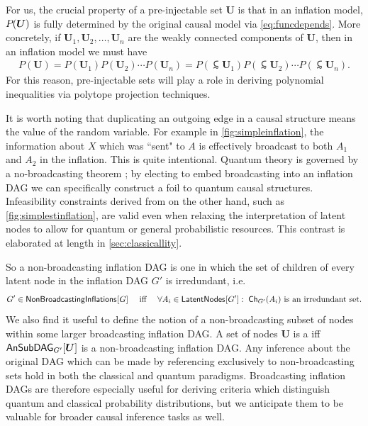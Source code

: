 {For us, the crucial property of a pre-injectable set $\bm{U}$ is that in an inflation model, $\pdf{\bm{U}}$ is fully determined by the original causal model via \cref{eq:funcdepends}. More concretely, if $\bm{U}_1,\bm{U}_2,\ldots,\bm{U}_n$ are the weakly connected components of $\bm{U}$, then in an inflation model we must have
\begin{align}\label{eq:preinjfactor}
	P(\bm{U}) = P(\bm{U}_1) P(\bm{U}_2)  \cdots P(\bm{U}_n) = P(\subsim{\bm{U}}_1) P(\subsim{\bm{U}}_2) \cdots P(\subsim{\bm{U}}_n).
\end{align}
For this reason, pre-injectable sets will play a role in deriving polynomial inequalities via polytope projection techniques.

It is worth noting that duplicating an outgoing edge in a causal structure means  the value of the random variable. For example in \cref{fig:simpleinflation}, the information about $X$ which was ``sent" to $A$ is effectively broadcast to both $A_1$ and $A_2$ in the inflation. This is quite intentional. Quantum theory is governed by a no-broadcasting theorem \cite{NoCloningQuantum1996,NoCloningGeneral2006}; by electing to embed broadcasting into an inflation DAG we can specifically construct a foil to quantum causal structures. Infeasibility constraints derived from  on the other hand, such as \cref{fig:simplestinflation}, are valid even when relaxing the interpretation of latent nodes to allow for quantum or general probabilistic resources. This contrast is elaborated at length in \cref{sec:classicallity}.  

So a non-broadcasting inflation DAG is one in which the set of children of every latent node in the inflation DAG $G'$ is irredundant, i.e.  
\begin{align}\label{eq:nonbroadcastinginflationDAG}
G'\in\SmallNamedFunction{NonBroadcastingInflations}{G} \quad\text{ iff }\quad \forall A_i\in \SmallNamedFunction{LatentNodes}{G'} :\; \Ch[G']{A_i} \text{ is an irredundant set.}
\end{align}
We also find it useful to define the notion of a non-broadcasting subset of nodes within some larger broadcasting inflation DAG. A set of nodes $\bm{U}$ is a  iff $\ansubgraph[G']{\bm{U}}$ is a non-broadcasting inflation DAG. Any inference about the original DAG which can be made by referencing exclusively to non-broadcasting sets hold in both the classical and quantum paradigms. Broadcasting inflation DAGs are therefore especially useful for deriving criteria which distinguish quantum and classical probability distributions, but we anticipate them to be valuable for broader causal inference tasks as well.

}
